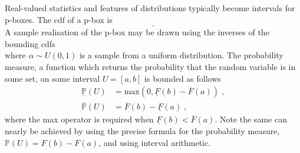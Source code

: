 \documentclass{juliacon}
\begin{document}
Real-valued statistics and features of distributions typically become intervals for p-boxes. The cdf of a p-box is
\begin{equation*}
  [\underline{F}(x), \overline{F}(x)] .
\end{equation*}
\noindent A sample realisation of the p-box may be drawn using the inverses of the bounding cdfs
\begin{equation*}
  [\overline{F}^{-1}(\alpha), \underline{F}^{-1}(\alpha)]
\end{equation*}
\noindent where $\alpha \sim U(0,1)$ is a sample from a uniform distribution. The probability measure,  a function which returns the probability that the random variable is in some set, on some interval $U = [a, b]$ is bounded as follows
\begin{align*}
  \underline{\mathbb{P}}(U) &= \text{max}(0, \underline{F}(b) - \overline{F}(a)) \;,\\ 
  \overline{\mathbb{P}}(U)  &= \overline{F}(b) - \underline{F}(a) \;,
\end{align*}
\noindent where the max operator is required when $\underline{F}(b) < \overline{F}(a)$. Note the same can nearly be achieved by using the precise formula for the probability measure, $\mathbb{P}(U) = F(b)- F(a)$, and using interval arithmetic.
\end{document}
